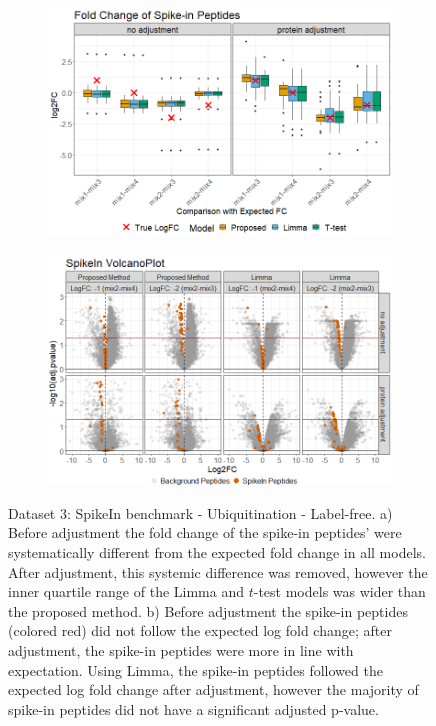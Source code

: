 \documentclass[mcp]{article}
\numberwithin{table}{section}
\begin{document}
\begin{figure}[ht]
\centering
\begin{subfigure}[c]{0.825\linewidth}
\includegraphics[width=1\textwidth]{images/spike_in_fc.png}
\caption{}
\label{fig:spikein_boxplot}
\end{subfigure}
\begin{subfigure}[c]{0.825\linewidth}
\includegraphics[width=1\textwidth]{images/spike_in_volcano.png}
\caption{}
\label{fig:spikein_prop_volcano}
\end{subfigure}
\caption{Dataset 3: SpikeIn benchmark - Ubiquitination - Label-free. a) Before adjustment the fold change of the spike-in peptides' were systematically different from the expected fold change in all models. After adjustment, this systemic difference was removed, however the inner quartile range of the Limma and $t$-test models was wider than the proposed method. b) Before adjustment the spike-in peptides (colored red) did not follow the expected log fold change; after adjustment, the spike-in peptides were more in line with expectation. Using Limma, the spike-in peptides followed the expected log fold change after adjustment, however the majority of spike-in peptides did not have a significant adjusted p-value.}
\label{fig:spikein_volcano}
\end{figure}
\end{document}

